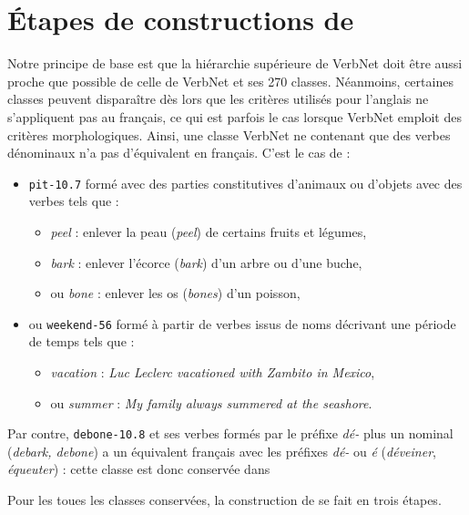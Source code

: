 \section{Étapes de constructions de \verbenet{}}

Notre principe de base est que la hiérarchie supérieure de VerbNet doit être
aussi proche que possible de celle de VerbNet et ses 270 classes. Néanmoins,
certaines classes peuvent disparaître dès lors que les critères utilisés pour
l'anglais ne s'appliquent pas au français, ce qui est parfois le cas lorsque
VerbNet emploit des critères morphologiques. Ainsi, une classe VerbNet ne
contenant que des verbes dénominaux n'a pas d'équivalent en français. C'est le
cas de :
\begin{itemize}
    \item {\color{blue}\texttt{pit-10.7}} formé avec des parties constitutives
        d'animaux ou d'objets avec des verbes tels que :
        \begin{itemize}
            \item \emph{peel} : enlever la peau (\emph{peel}) de certains fruits
                et légumes,
            \item \emph{bark} : enlever l'écorce (\emph{bark}) d'un arbre ou
                d'une buche,
            \item ou \emph{bone} : enlever les os (\emph{bones}) d'un poisson,
        \end{itemize}
    \item ou {\color{blue}\texttt{weekend-56}} formé à partir de verbes issus
        de noms décrivant une période de temps tels que :
        \begin{itemize}
            \item \emph{vacation} : \emph{Luc Leclerc vacationed with Zambito in
                Mexico},
            \item ou \emph{summer} : \emph{My family always summered at the seashore}.
        \end{itemize}
\end{itemize}

Par contre, {\color{blue}\texttt{debone-10.8}} et ses verbes formés par le
préfixe \emph{dé-} plus un nominal (\emph{debark, debone}) a un équivalent
français avec les préfixes \emph{dé-} ou \emph{é} (\emph{déveiner},
\emph{équeuter}) : cette classe est donc conservée dans \verbenet{}

Pour les toues les classes conservées, la construction de \verbenet{} se fait
en trois étapes.

